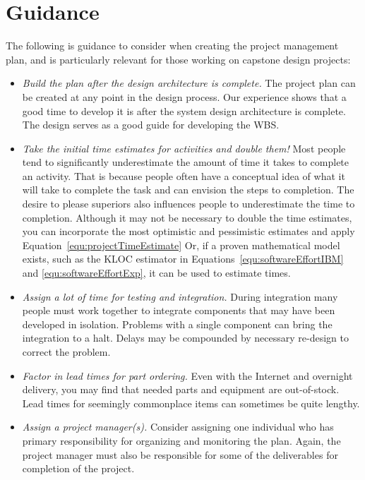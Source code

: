 \section{Guidance}
\label{section:guidance}

The following is guidance to consider when creating the project
management plan, and is particularly relevant for those working on
capstone design projects:

\begin{itemize}
\item
  \emph{Build the plan after the design architecture is complete.} The
  project plan can be created at any point in the design process. Our
  experience shows that a good time to develop it is after the system
  design architecture is complete. The design serves as a good guide for
  developing the WBS.
\item
  \emph{Take the initial time estimates for activities and double them!}
  Most people tend to significantly underestimate the amount of time it
  takes to complete an activity. That is because people often have a
  conceptual idea of what it will take to complete the task and can
  envision the steps to completion. The desire to please superiors also
  influences people to underestimate the time to completion. Although it
  may not be necessary to double the time estimates, you can incorporate
  the most optimistic and pessimistic estimates and apply 
Equation~\ref{equ:projectTimeEstimate}
  Or, if a proven mathematical model exists, such as the KLOC estimator
  in Equations~\ref{equ:softwareEffortIBM} and \ref{equ:softwareEffortExp}, 
it can be used to estimate times.
\item
  \emph{Assign a lot of time for testing and integration.} During
  integration many people must work together to integrate components
  that may have been developed in isolation. Problems with a single
  component can bring the integration to a halt. Delays may be
  compounded by necessary re-design to correct the problem.
\item
  \emph{Factor in lead times for part ordering.} Even with the Internet
  and overnight delivery, you may find that needed parts and equipment
  are out-of-stock. Lead times for seemingly commonplace items can
  sometimes be quite lengthy.
\item
  \emph{Assign a project manager(s).} Consider assigning one individual
  who has primary responsibility for organizing and monitoring the plan.
  Again, the project manager must also be responsible for some of the
  deliverables for completion of the project.

\end{itemize}
